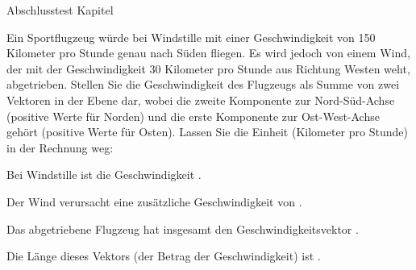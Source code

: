 \begin{MTest}{Abschlusstest Kapitel }
\begin{MExercise}
Ein Sportflugzeug würde bei Windstille mit einer Geschwindigkeit von
150 Kilometer pro Stunde genau nach Süden fliegen. Es wird jedoch von einem Wind,
der mit der Geschwindigkeit 30 Kilometer pro Stunde aus Richtung Westen weht,
abgetrieben. Stellen Sie die Geschwindigkeit des Flugzeugs als Summe von zwei Vektoren in der Ebene dar, wobei
die zweite Komponente zur Nord-Süd-Achse (positive Werte für Norden) und die erste Komponente
zur Ost-West-Achse gehört (positive Werte für Osten). Lassen Sie die Einheit (Kilometer pro Stunde)
in der Rechnung weg:
\begin{MExerciseItems}
\item{Bei Windstille ist die Geschwindigkeit .}
\item{Der Wind verursacht eine zusätzliche Geschwindigkeit von .}
\item{Das abgetriebene Flugzeug hat insgesamt den Geschwindigkeitsvektor .}
\item{Die Länge dieses Vektors (der Betrag der Geschwindigkeit) ist .\\
}
\end{MExerciseItems}
\end{MExercise}


\end{MTest}
